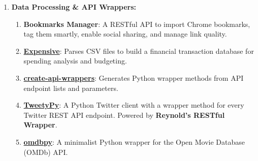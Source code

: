 \documentclass[oneside]{article}%
\begin{document}
\begin{enumerate}[]
\begin{enumerate}[]
			\normalsize
			\item \textbf{Data Processing \& API Wrappers:}
			\small
				\begin{enumerate}[-]
					\item \textbf{Bookmarks Manager}: A RESTful API to import Chrome bookmarks, tag them smartly, enable social sharing, and manage link quality.
					\item \textbf{\href{https://github.com/blairg23/expense-analysis}{Expensive}}: Parses CSV files to build a financial transaction database for spending analysis and budgeting.
					\item \textbf{\href{https://github.com/blairg23/create-api-wrappers}{create-api-wrappers}}: Generates Python wrapper methods from API endpoint lists and parameters.
					\item \textbf{\href{https://github.com/blairg23/TweetyPy}{TweetyPy}}: A Python Twitter client with a wrapper method for every Twitter REST API endpoint. Powered by \textbf{Reynold's RESTful Wrapper\textsuperscript{\textcopyright}}.
					\item \textbf{\href{https://github.com/blairg23/omdbpy}{omdbpy}}: A minimalist Python wrapper for the Open Movie Database (OMDb) API.
				\end{enumerate}
\clearpage


\end{enumerate}
\end{enumerate}
\end{document}
